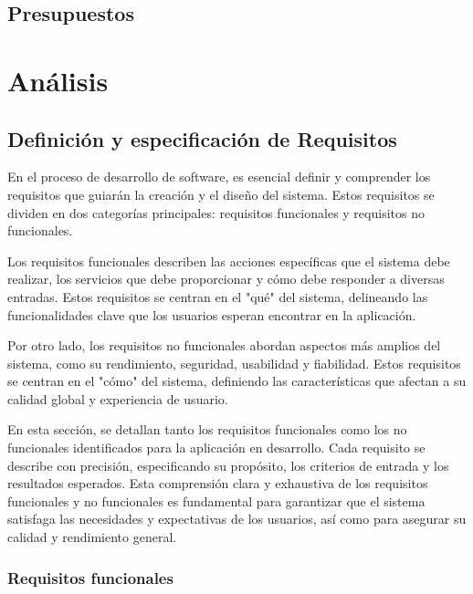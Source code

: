 \documentclass[a4paper, 12pt]{article}
\begin{document}
\newpage
\subsection{Presupuestos}

\newpage
\section{Análisis}

\subsection{Definición y especificación de Requisitos}

En el proceso de desarrollo de software, es esencial definir y comprender los requisitos que guiarán la creación y el diseño del sistema. Estos requisitos se dividen en dos categorías principales: requisitos funcionales y requisitos no funcionales.

Los requisitos funcionales describen las acciones específicas que el sistema debe realizar, los servicios que debe proporcionar y cómo debe responder a diversas entradas. Estos requisitos se centran en el "qué" del sistema, delineando las funcionalidades clave que los usuarios esperan encontrar en la aplicación.

Por otro lado, los requisitos no funcionales abordan aspectos más amplios del sistema, como su rendimiento, seguridad, usabilidad y fiabilidad. Estos requisitos se centran en el "cómo" del sistema, definiendo las características que afectan a su calidad global y experiencia de usuario.

En esta sección, se detallan tanto los requisitos funcionales como los no funcionales identificados para la aplicación en desarrollo. Cada requisito se describe con precisión, especificando su propósito, los criterios de entrada y los resultados esperados. Esta comprensión clara y exhaustiva de los requisitos funcionales y no funcionales es fundamental para garantizar que el sistema satisfaga las necesidades y expectativas de los usuarios, así como para asegurar su calidad y rendimiento general.

\subsubsection{Requisitos funcionales}
\end{document}
